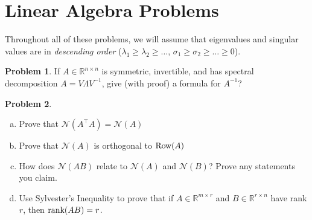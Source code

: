 \documentclass{amsart}[11pt]
\theoremstyle{definition}
\newtheorem{problem}{Problem}
\newcommand{\R}{\mathbb{R}}
\newcommand{\row}{\textnormal{Row}}
\newcommand{\rank}{\textnormal{rank}}
\begin{document}
\section{Linear Algebra Problems}

Throughout all of these problems, we will assume that eigenvalues and singular values are in \textit{descending order} ($\lambda_1\geq\lambda_2\geq\dots$, $\sigma_1\geq\sigma_2\geq\dots\geq0$).

\begin{problem}
If $A\in\R^{n\times n}$ is symmetric, invertible, and has spectral decomposition $A=V\Lambda V^{-1}$, give (with proof) a formula for $A^{-1}$?
\end{problem}



%
%


\begin{problem}
\begin{enumerate}[(a)]
    \item Prove that $\mathcal{N}(A^\top A)=\mathcal{N}(A)$
    \item Prove that $\mathcal{N}(A)$ is orthogonal to $\row(A)$
    \item How does $\mathcal{N}(AB)$ relate to $\mathcal{N}(A)$ and $\mathcal{N}(B)$? Prove any statements you claim.
    \item Use Sylvester's Inequality to prove that if $A\in\R^{m\times r}$ and $B\in\R^{r\times n}$ have rank $r$, then $\rank(AB)=r$.
\end{enumerate}
\end{problem}
\end{document}
